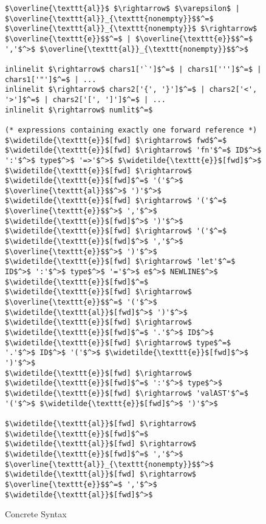 \begin{figure}
\begin{lstlisting}[mathescape]
$\overline{\texttt{al}}$ $\rightarrow$ $\varepsilon$ | $\overline{\texttt{al}}_{\texttt{nonempty}}$$^=$
$\overline{\texttt{al}}_{\texttt{nonempty}}$ $\rightarrow$ $\overline{\texttt{e}}$$^=$ | $\overline{\texttt{e}}$$^=$ ','$^>$ $\overline{\texttt{al}}_{\texttt{nonempty}}$$^>$

inlinelit $\rightarrow$ chars1['`']$^=$ | chars1[''']$^=$ | chars1['"']$^=$ | ...
inlinelit $\rightarrow$ chars2['{', '}']$^=$ | chars2['<', '>']$^=$ | chars2['[', ']']$^=$ | ...
inlinelit $\rightarrow$ numlit$^=$

(* expressions containing exactly one forward reference *)
$\widetilde{\texttt{e}}$[fwd] $\rightarrow$ fwd$^=$
$\widetilde{\texttt{e}}$[fwd] $\rightarrow$ 'fn'$^=$ ID$^>$ ':'$^>$ type$^>$ '=>'$^>$ $\widetilde{\texttt{e}}$[fwd]$^>$
$\widetilde{\texttt{e}}$[fwd] $\rightarrow$ $\widetilde{\texttt{e}}$[fwd]$^=$ '('$^>$ $\overline{\texttt{al}}$$^>$ ')'$^>$
$\widetilde{\texttt{e}}$[fwd] $\rightarrow$ '('$^=$ $\overline{\texttt{e}}$$^>$ ','$^>$ $\widetilde{\texttt{e}}$[fwd]$^>$ ')'$^>$
$\widetilde{\texttt{e}}$[fwd] $\rightarrow$ '('$^=$ $\widetilde{\texttt{e}}$[fwd]$^>$ ','$^>$ $\overline{\texttt{e}}$$^>$ ')'$^>$
$\widetilde{\texttt{e}}$[fwd] $\rightarrow$ 'let'$^=$ ID$^>$ ':'$^>$ type$^>$ '='$^>$ e$^>$ NEWLINE$^>$ $\widetilde{\texttt{e}}$[fwd]$^=$
$\widetilde{\texttt{e}}$[fwd] $\rightarrow$ $\overline{\texttt{e}}$$^=$ '('$^>$ $\widetilde{\texttt{al}}$[fwd]$^>$ ')'$^>$
$\widetilde{\texttt{e}}$[fwd] $\rightarrow$ $\widetilde{\texttt{e}}$[fwd]$^=$ '.'$^>$ ID$^>$
$\widetilde{\texttt{e}}$[fwd] $\rightarrow$ type$^=$ '.'$^>$ ID$^>$ '('$^>$ $\widetilde{\texttt{e}}$[fwd]$^>$ ')'$^>$
$\widetilde{\texttt{e}}$[fwd] $\rightarrow$ $\widetilde{\texttt{e}}$[fwd]$^=$ ':'$^>$ type$^>$
$\widetilde{\texttt{e}}$[fwd] $\rightarrow$ 'valAST'$^=$ '('$^>$ $\widetilde{\texttt{e}}$[fwd]$^>$ ')'$^>$

$\widetilde{\texttt{al}}$[fwd] $\rightarrow$ $\widetilde{\texttt{e}}$[fwd]$^=$
$\widetilde{\texttt{al}}$[fwd] $\rightarrow$ $\widetilde{\texttt{e}}$[fwd]$^=$ ','$^>$ $\overline{\texttt{al}}_{\texttt{nonempty}}$$^>$
$\widetilde{\texttt{al}}$[fwd] $\rightarrow$ $\overline{\texttt{e}}$$^=$ ','$^>$ $\widetilde{\texttt{al}}$[fwd]$^>$
\end{lstlisting}
\caption{Concrete Syntax}
\label{f-grammar}
\end{figure}
